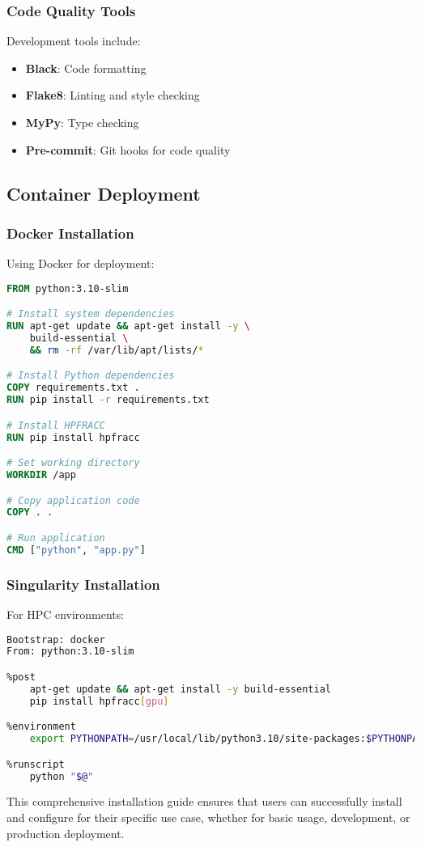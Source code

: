 \subsubsection{Code Quality Tools}
Development tools include:
\begin{itemize}
    \item \textbf{Black}: Code formatting
    \item \textbf{Flake8}: Linting and style checking
    \item \textbf{MyPy}: Type checking
    \item \textbf{Pre-commit}: Git hooks for code quality
\end{itemize}

\subsection{Container Deployment}

\subsubsection{Docker Installation}
Using Docker for deployment:

\begin{lstlisting}[language=dockerfile, caption=Dockerfile Example]
FROM python:3.10-slim

# Install system dependencies
RUN apt-get update && apt-get install -y \
    build-essential \
    && rm -rf /var/lib/apt/lists/*

# Install Python dependencies
COPY requirements.txt .
RUN pip install -r requirements.txt

# Install HPFRACC
RUN pip install hpfracc

# Set working directory
WORKDIR /app

# Copy application code
COPY . .

# Run application
CMD ["python", "app.py"]
\end{lstlisting}

\subsubsection{Singularity Installation}
For HPC environments:

\begin{lstlisting}[language=bash, caption=Singularity Recipe]
Bootstrap: docker
From: python:3.10-slim

%post
    apt-get update && apt-get install -y build-essential
    pip install hpfracc[gpu]

%environment
    export PYTHONPATH=/usr/local/lib/python3.10/site-packages:$PYTHONPATH

%runscript
    python "$@"
\end{lstlisting}

This comprehensive installation guide ensures that users can successfully install and configure \hpfracc for their specific use case, whether for basic usage, development, or production deployment.